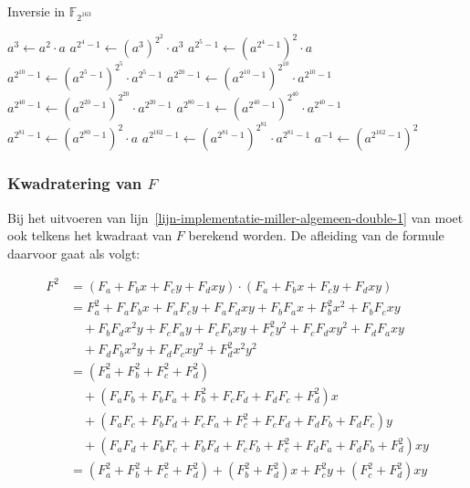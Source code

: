 \begin{algorithm}[h]
	\caption{Inversie in $\mathbb{F}_{2^{163}}$}
	\label{algoritme-implementatie-miller-inversie}
	$a^3 \leftarrow a^2 \cdot a$\;
	$a^{2^4 - 1} \leftarrow (a^3)^{2^2} \cdot a^3$\;
	$a^{2^5 - 1} \leftarrow (a^{2^4 - 1})^2 \cdot a$\;
	$a^{2^{10} - 1} \leftarrow (a^{2^5 - 1})^{2^5} \cdot a^{2^5 - 1}$\;
	$a^{2^{20} - 1} \leftarrow (a^{2^{10} - 1})^{2^{10}} \cdot a^{2^{10} - 1}$\;
	$a^{2^{40} - 1} \leftarrow (a^{2^{20} - 1})^{2^{20}} \cdot a^{2^{20} - 1}$\;
	$a^{2^{80} - 1} \leftarrow (a^{2^{40} - 1})^{2^{40}} \cdot a^{2^{40} - 1}$\;
	$a^{2^{81} - 1} \leftarrow (a^{2^{80} - 1})^2 \cdot a$\;
	$a^{2^{162} - 1} \leftarrow (a^{2^{81} - 1})^{2^{81}} \cdot a^{2^{81} - 1}$\;
	$a^{-1} \leftarrow (a^{2^{162} - 1})^2$\;
\end{algorithm}

\subsubsection{Kwadratering van $F$}

Bij het uitvoeren van lijn~\ref{lijn-implementatie-miller-algemeen-double-1} van  moet ook telkens het kwadraat van $F$ berekend worden. De afleiding van de formule daarvoor gaat als volgt:

\[\begin{aligned}
F^2	&= (F_a + F_b x + F_c y + F_d xy) \cdot (F_a + F_b x + F_c y + F_d xy)\\
		&= F_a^2 + F_a F_b x + F_a F_c y + F_a F_d xy + F_b F_a x + F_b^2 x^2 + F_b F_c xy\\
			&\quad + F_b F_d x^2y + F_c F_a y + F_c F_b xy + F_c^2 y^2 + F_c F_d xy^2 + F_d F_a xy\\
			&\quad + F_d F_b x^2y + F_d F_c xy^2 + F_d^2 x^2 y^2\\
		&= (F_a^2 + F_b^2 + F_c^2 + F_d^2)\\
			&\quad + (F_a F_b + F_b F_a + F_b^2 + F_c F_d + F_d F_c + F_d^2)x\\
			&\quad + (F_a F_c + F_b F_d + F_c F_a + F_c^2 + F_c F_d + F_d F_b + F_d F_c)y\\
			&\quad + (F_a F_d + F_b F_c + F_b F_d + F_c F_b + F_c^2 + F_d F_a + F_d F_b + F_d^2)xy\\
		&= (F_a^2 + F_b^2 + F_c^2 + F_d^2) + (F_b^2 + F_d^2)x + F_c^2 y + (F_c^2 + F_d^2)xy\\
\end{aligned}\]

